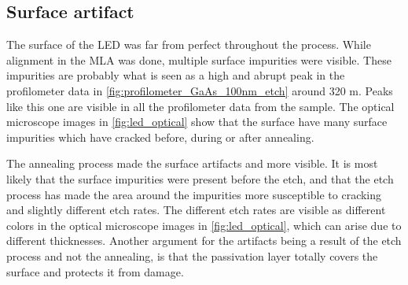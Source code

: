 



\subsection{Surface artifact}
\label{sec:discussion:surface_artifact}

The surface of the LED was far from perfect throughout the process.
While alignment in the MLA was done, multiple surface impurities were visible. 
These impurities are probably what is seen as a high and abrupt peak in the profilometer data in \autoref{fig:profilometer_GaAs_100nm_etch} around 320 \textmu m.
Peaks like this one are visible in all the profilometer data from the sample. 
The optical microscope images in \autoref{fig:led_optical} show that the surface have many surface impurities which have cracked before, during or after annealing. 


The annealing process made the surface artifacts and more visible.
It is most likely that the surface impurities were present before the etch, and that the etch process has made the area around the impurities more susceptible to cracking and slightly different etch rates.
The different etch rates are visible as different colors in the optical microscope images in \autoref{fig:led_optical}, which can arise due to different thicknesses. 
Another argument for the artifacts being a result of the etch process and not the annealing, is that the passivation layer totally covers the surface and protects it from damage. 





